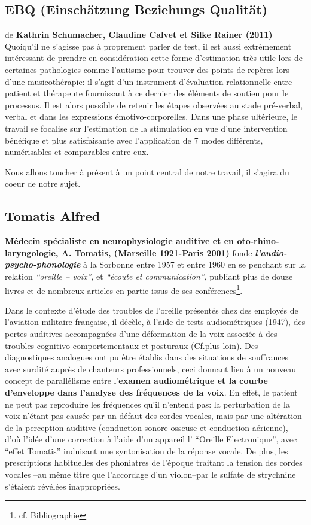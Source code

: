 \subsection{EBQ (Einschätzung Beziehungs Qualität)}
de \textbf{Kathrin Schumacher, Claudine Calvet et Silke Rainer (2011)}
Quoiqu'il ne s'agisse pas à proprement parler de test, il est aussi
extrêmement intéressant de prendre en  considération cette forme
d'estimation très
utile lors de certaines pathologies comme l'autisme pour trouver des
points de repères lors d'une musicothérapie: il s'agit d'un instrument d'évaluation relationnelle entre patient et
thérapeute fournissant à ce dernier des éléments de soutien pour le
processus.
Il est alors possible de retenir les étapes
observées au stade pré-verbal, verbal et dans les expressions
émotivo-corporelles.
Dans une phase ultérieure, le travail se focalise sur l'estimation de
la stimulation en vue d'une intervention bénéfique et plus
satisfaisante avec l'application de 7 modes différents, numérisables
et comparables entre eux. \autocite{EBQ-key}

Nous allons toucher à présent à un point central de notre travail, il
s'agira du coeur de notre sujet.
  
\subsection{Tomatis Alfred}

\textbf{Médecin spécialiste en neurophysiologie auditive et en
oto-rhino-laryngologie, A. Tomatis, (Marseille 1921-Paris 2001) } fonde
\textit{\textbf{l'audio-psycho-phonologie }} à la Sorbonne entre 
1957 et entre 1960 en  se penchant sur la relation 
\textit{``oreille -- voix''}, et  \textit{``écoute
et communication''}, publiant plus de douze livres et de nombreux
articles en partie issus de ses
conférences\footnote{cf. Bibliographie}.


Dans le contexte d'étude des troubles de
l'oreille présentés chez des employés de l'aviation militaire
française, il décèle, à l'aide
de tests audiométriques
 (1947), des pertes auditives accompagnées d'une
déformation de la voix associée à des troubles
cognitivo-comportementaux et posturaux (Cf.plus loin).
Des diagnostiques analogues ont pu être établis dans des situations
de souffrances avec surdité auprès de chanteurs professionnels,
ceci donnant lieu
à un nouveau concept de
parallélisme entre l'\textbf{examen audiométrique et la courbe
d'enveloppe dans l'analyse des fréquences de la voix}.
En effet, le patient ne peut pas reproduire les fréquences qu'il
n'entend pas: 
la perturbation de la voix n'étant pas causée par un défaut des cordes
vocales, mais par une altération de la perception auditive (conduction
sonore osseuse et conduction aérienne), d'où
l'idée d'une correction à l'aide d'un appareil l' ``Oreille
Electronique'', avec ``effet Tomatis'' induisant
une syntonisation de la réponse vocale.
 De plus, les prescriptions habituelles des phoniatres de
l'époque traitant la tension des cordes vocales --au même titre que
l'accordage d'un violon--par le sulfate de
strychnine s'étaient révélées inappropriées.

